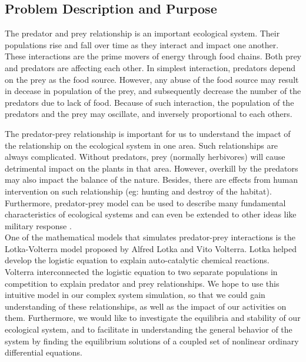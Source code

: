 \documentclass{article}
\begin{document}
\begin{normalsize}
		\section{Problem Description and Purpose}
		The predator and prey relationship is an important ecological system. Their populations rise and fall over time as they interact and impact one another. These interactions are the prime movers of energy through food chains. Both prey and predators are affecting each other. \cite{laham_2012_a}In simplest interaction, predators depend on the prey as the food source. However, any abuse of the food source may result in decease in population of the prey, and subsequently decrease the number of the predators due to lack of food. Because of such interaction, the population of the predators and the prey may oscillate, and inversely proportional to each others.\cite{obaid_2013_the}\
		
		The predator-prey relationship is important for us to understand the impact of the relationship on the ecological system in one area. Such relationships are always complicated. Without predators, prey (normally herbivores) will cause detrimental impact on the plants in that area. However, overkill by the predators may also impact the balance of the nature. Besides, there are effects from human intervention on such relationship (eg: hunting and destroy of the habitat). Furthermore, predator-prey model can be used to describe many fundamental characteristics of ecological systems and can even be extended to other ideas like military response \cite{derrik}.\\
		
		One of the mathematical models that simulates predator-prey interactions is the Lotka-Volterra model proposed by Alfred Lotka and Vito Volterra. Lotka helped develop the logistic equation to explain auto-catalytic chemical reactions. Volterra interconnected the logistic equation to two separate populations in competition to explain predator and prey relationships. We hope to use this intuitive model in our complex system simulation, so that we could gain understanding of these relationships, as well as the impact of our activities on them. Furthermore, we would like to investigate the equilibria and stability of our ecological system, and to facilitate in understanding the general behavior of the system by finding the equilibrium solutions of a coupled set of nonlinear ordinary differential equations.\cite{tung_2007_topics}\cite{a2018_alfred}

\end{normalsize}
\end{document}
